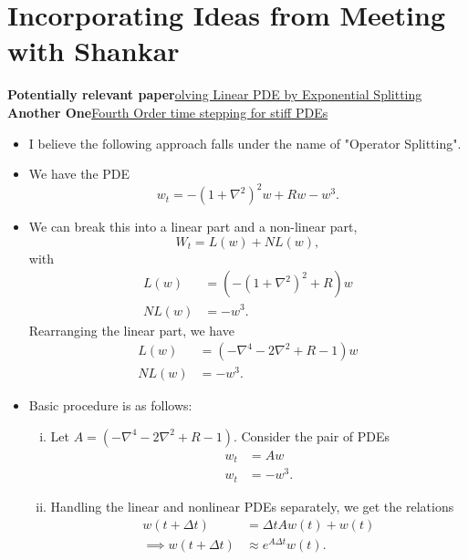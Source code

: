 \documentclass[12pt]{article}
\begin{document}
\section{Incorporating Ideas from Meeting with Shankar}
\textbf{Potentially relevant paper}\href{https://citeseerx.ist.psu.edu/viewdoc/download?doi=10.1.1.879.2994&rep=rep1&type=pdf}{olving Linear PDE by Exponential Splitting}\newline
\textbf{Another One}\href{https://people.maths.ox.ac.uk/trefethen/publication/PDF/2005_111.pdf}{Fourth Order time stepping for stiff PDEs}\newline
\begin{itemize}
    \item I believe the following approach falls under the name of "Operator Splitting".
    \item We have the PDE
        \[
            w_t = -(1+\nabla^2)^2w + Rw - w^3.
        \] 
    \item
        We can break this into a linear part and a non-linear part,
        \[
            W_t = L(w) + NL(w),
        \] 
        with
        \begin{align*}
            L(w) &= (-(1+\nabla^2)^2+R)w\\
            NL(w) &=  - w^3.
        \end{align*}
        Rearranging the linear part, we have
        \begin{align*}
            L(w) &= (-\nabla^4-2\nabla^2+R-1)w\\
            NL(w) &= -w^3.
        \end{align*}
      \item 
        Basic procedure is as follows:
        \begin{enumerate}[(i)]
            \item Let $A = (-\nabla^4-2\nabla^2+R-1)$. Consider the pair of PDEs
                \begin{align*}
                    w_t &= Aw\\
                    w_t &= -w^3.
                \end{align*}
            \item
                Handling the linear and nonlinear PDEs separately, we get the relations
                \begin{align*}
                    w(t+\Delta t) &= \Delta t Aw(t)+w(t)\\
                    \implies w(t+\Delta t) &\approx e^{A\Delta t}w(t).
                \end{align*}

\end{enumerate}
\end{itemize}
\end{document}
